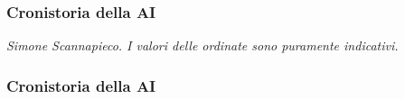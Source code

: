 %
\begin{frame}[t,fragile] \frametitle{Cronistoria della AI}
	\vspace*{-15pt}
	\begin{flushright}
    	\vspace*{-10pt}
        {\tiny\textit{\textcopyright Simone Scannapieco. I valori delle ordinate sono puramente indicativi.}}
	\end{flushright}
\end{frame}
%
\begin{frame}[t,fragile] \frametitle{Cronistoria della AI}

\end{frame}
%
